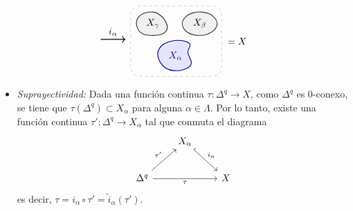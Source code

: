 \begin{dem}
\[\begin{tikzpicture}[baseline=(current bounding box.center), scale=0.95]
    \draw[->, thick] (3.3, 1.0) -- (4.25, 1.0) node[midway, above] {$i_\alpha$};

    \draw[dashed, gray!60, rounded corners=10pt] (4.45, -0.42) rectangle (7.95, 2.28);

    \fill[gray!12] plot[smooth cycle, tension=0.75] coordinates {
        (4.75, 1.35) (5.2, 1.15) (5.8, 1.3) (5.75, 1.75) (5.3, 2.05) (4.75, 1.85)
    };
    \draw[thick, black!80] plot[smooth cycle, tension=0.75] coordinates {
        (4.75, 1.35) (5.2, 1.15) (5.8, 1.3) (5.75, 1.75) (5.3, 2.05) (4.75, 1.85)
    };
    \node at (5.3, 1.6) {$X_\gamma$};

    \fill[gray!12] plot[smooth cycle, tension=0.75] coordinates {
        (6.5, 1.4) (7.05, 1.15) (7.65, 1.35) (7.7, 1.8) (7.15, 2.05) (6.55, 1.85)
    };
    \draw[thick, black!80] plot[smooth cycle, tension=0.75] coordinates {
        (6.5, 1.4) (7.05, 1.15) (7.65, 1.35) (7.7, 1.8) (7.15, 2.05) (6.55, 1.85)
    };
    \node at (7.1, 1.6) {$X_\beta$};

    \fill[blue!10] plot[smooth cycle, tension=0.75] coordinates {
        (5.6, 0.1) (6.1, -0.2) (6.75, 0.0) (6.65, 0.5) (6.7, 0.85) (6.1, 0.95) (5.55, 0.65)
    };
    \draw[thick, blue!55!black] plot[smooth cycle, tension=0.75] coordinates {
        (5.6, 0.1) (6.1, -0.2) (6.75, 0.0) (6.65, 0.5) (6.7, 0.85) (6.1, 0.95) (5.55, 0.65)
    };
    \node[blue!55!black] at (6.17, 0.37) {$X_\alpha$};

    \node[right] at (8.05, 0.93) {$= X$};
\end{tikzpicture}
\]

\begin{itemize}
    \item \textit{Suprayectividad:} Dada una función continua $\tau \colon \Delta^q \to X$, como $\Delta^q$ es $0$-conexo, se tiene que $\tau(\Delta^q) \subset X_\alpha$ para alguna $\alpha \in \Lambda$. Por lo tanto, existe una función continua $\tau' \colon \Delta^q \to X_\alpha$ tal que conmuta el diagrama
    \[
    \begin{tikzcd}[column sep=2.2em, row sep=2.2em]
    & X_\alpha \arrow[dr, hook, "i_\alpha"] & \\
    \Delta^q \arrow[ur, "\tau'"] \arrow[rr, "\tau"'] & & X
    \end{tikzcd}
    \]
    es decir, $\tau = i_\alpha \circ \tau' = \tilde{i}_\alpha(\tau')$.


\end{itemize}
\end{dem}
